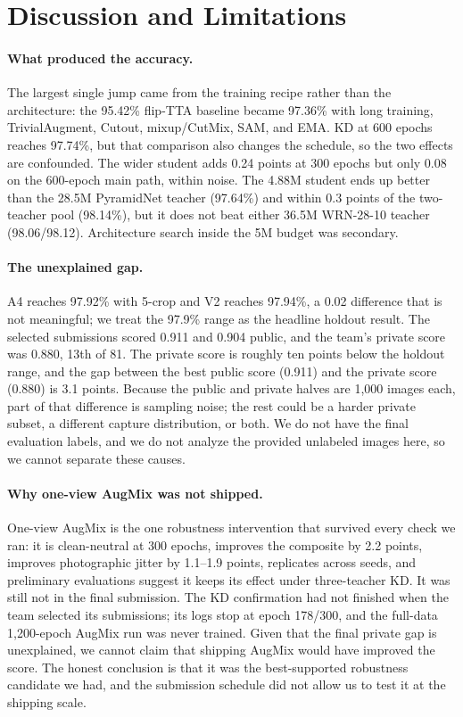 \section{Discussion and Limitations}
\label{sec:discussion}

\paragraph{What produced the accuracy.}
The largest single jump came from the training recipe rather than the
architecture: the 95.42\% flip-TTA baseline became 97.36\% with long training,
TrivialAugment, Cutout, mixup/CutMix, SAM, and EMA. KD at 600 epochs reaches
97.74\%, but that comparison also changes the schedule, so the two effects are
confounded. The wider student adds 0.24 points at 300 epochs but only 0.08
on the 600-epoch main path, within noise. The 4.88M student ends up better than
the 28.5M PyramidNet teacher (97.64\%) and within 0.3 points of the two-teacher
pool (98.14\%), but it does not beat either 36.5M WRN-28-10 teacher
(98.06/98.12). Architecture search inside the 5M budget was secondary.

\paragraph{The unexplained gap.}
A4 reaches 97.92\% with 5-crop and V2 reaches 97.94\%, a 0.02 difference that is
not meaningful; we treat the 97.9\% range as the headline holdout result. The
selected submissions scored 0.911 and 0.904 public, and the team's private score
was 0.880, 13th of 81. The private score is roughly ten points below the holdout
range, and the gap between the best public score (0.911) and the private score
(0.880) is 3.1 points. Because the public and private halves are 1,000 images
each, part of that difference is sampling noise; the rest could be a harder
private subset, a different capture distribution, or both. We do not have the
final evaluation labels, and we do not analyze the provided unlabeled images
here, so we cannot separate these causes.

\paragraph{Why one-view AugMix was not shipped.}
One-view AugMix is the one robustness intervention that survived every check we
ran: it is clean-neutral at 300 epochs, improves the composite by 2.2 points,
improves photographic jitter by 1.1--1.9 points, replicates across seeds, and
preliminary evaluations suggest it keeps its effect under three-teacher KD. It was still not in the final submission.
The KD confirmation had not finished when the team selected its submissions; its
logs stop at epoch 178/300, and the full-data 1,200-epoch AugMix run was never
trained. Given that the final private gap is unexplained, we cannot claim that
shipping AugMix would have improved the score. The honest conclusion is that it
was the best-supported robustness candidate we had, and the submission schedule
did not allow us to test it at the shipping scale.

